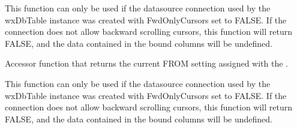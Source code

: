 \label{wxdbtablegetfirst}



This function can only be used if the datasource connection used by the wxDbTable instance was created with FwdOnlyCursors set to FALSE.  If the connection does not allow backward scrolling cursors, this function will return FALSE, and the data contained in the bound columns will be undefined.



\label{wxdbtablegetfromclause}


Accessor function that returns the current FROM setting assigned with the .

\label{wxdbtablegetlast}



This function can only be used if the datasource connection used by the wxDbTable instance was created with FwdOnlyCursors set to FALSE.  If the connection does not allow backward scrolling cursors, this function will return FALSE, and the data contained in the bound columns will be undefined.



\label{wxdbtablegetnewcursor}





\label{wxdbtablegetnext}




\label{wxdbtablegetnumberofcolumns}

